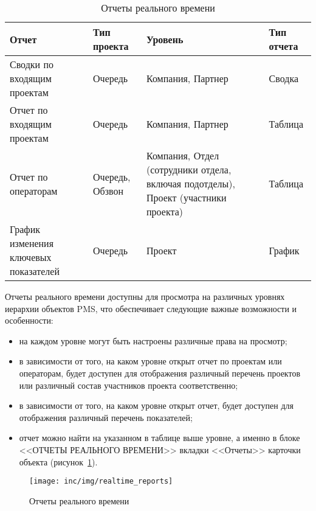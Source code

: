 \begin{table}[ht]
    \caption{Отчеты реального времени}
    \begin{small}
        \begin{tabular}{|p{}|p{}|p{}|p{}|}
            \hline
            Отчет & Тип проекта & Уровень & Тип отчета \\
            \hline
            Сводки по входящим проектам & Очередь & Компания, Партнер & Сводка  \\
            \hline
            Отчет по входящим проектам & Очередь & Компания, Партнер & Таблица  \\
            \hline
            Отчет по операторам & Очередь, Обзвон & Компания, Отдел (сотрудники отдела, включая подотделы), Проект (участники проекта) & Таблица  \\
            \hline
            График изменения ключевых показателей & Очередь & Проект & График  \\
            \hline
        \end{tabular}
    \end{small}
    \label{tab:orders}
\end{table}

Отчеты реального времени доступны для просмотра на различных уровнях иерархии объектов PMS, что обеспечивает следующие важные возможности и особенности:
\begin{itemize}
    \item на каждом уровне могут быть настроены различные права на просмотр;
    \item в зависимости от того, на каком уровне открыт отчет по проектам или операторам, будет доступен для отображения различный перечень проектов или различный состав участников проекта соответственно;
    \item в зависимости от того, на каком уровне открыт отчет, будет доступен для отображения различный перечень показателей;
    \item отчет можно найти на указанном в таблице выше уровне, а именно в блоке <<ОТЧЕТЫ РЕАЛЬНОГО ВРЕМЕНИ>> вкладки <<Отчеты>> карточки объекта (рисунок~\ref{pic:realtimereports}).
\end{itemize}

\begin{figure}[ht]
    \texttt{[image: inc/img/realtime\_reports]}
    \caption{Отчеты реального времени}
    \label{pic:realtimereports}
\end{figure}

